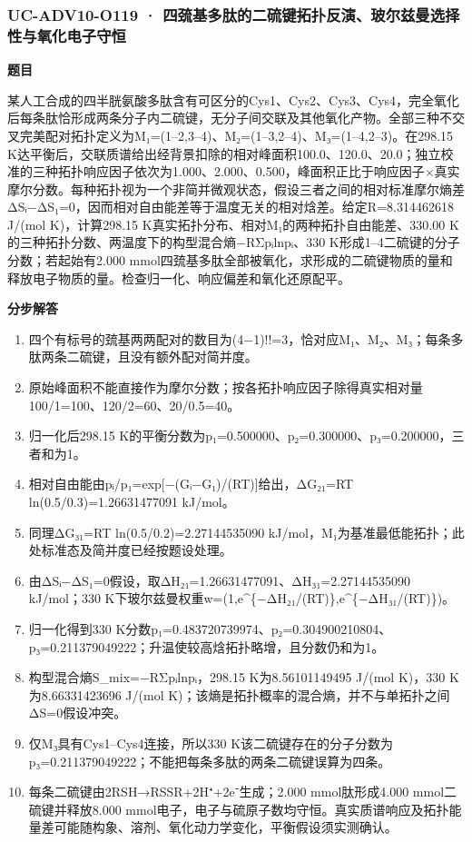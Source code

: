 \documentclass[UTF8,11pt,a4paper]{ctexart}
\begin{document}
\subsubsection*{UC-ADV10-O119 · 四巯基多肽的二硫键拓扑反演、玻尔兹曼选择性与氧化电子守恒}
\noindent\textbf{题目}\par
某人工合成的四半胱氨酸多肽含有可区分的Cys1、Cys2、Cys3、Cys4，完全氧化后每条肽恰形成两条分子内二硫键，无分子间交联及其他氧化产物。全部三种不交叉完美配对拓扑定义为M₁=(1–2,3–4)、M₂=(1–3,2–4)、M₃=(1–4,2–3)。在298.15 K达平衡后，交联质谱给出经背景扣除的相对峰面积100.0、120.0、20.0；独立校准的三种拓扑响应因子依次为1.000、2.000、0.500，峰面积正比于响应因子×真实摩尔分数。每种拓扑视为一个非简并微观状态，假设三者之间的相对标准摩尔熵差ΔSᵢ−ΔS₁=0，因而相对自由能差等于温度无关的相对焓差。给定R=8.314462618 J/(mol K)，计算298.15 K真实拓扑分布、相对M₁的两种拓扑自由能差、330.00 K的三种拓扑分数、两温度下的构型混合熵−RΣpᵢlnpᵢ、330 K形成1–4二硫键的分子分数；若起始有2.000 mmol四巯基多肽全部被氧化，求形成的二硫键物质的量和释放电子物质的量。检查归一化、响应偏差和氧化还原配平。\par
\medskip\noindent\textbf{分步解答}
\begin{enumerate}
\item 四个有标号的巯基两两配对的数目为(4−1)!!=3，恰对应M₁、M₂、M₃；每条多肽两条二硫键，且没有额外配对简并度。
\item 原始峰面积不能直接作为摩尔分数；按各拓扑响应因子除得真实相对量100/1=100、120/2=60、20/0.5=40。
\item 归一化后298.15 K的平衡分数为p₁=0.500000、p₂=0.300000、p₃=0.200000，三者和为1。
\item 相对自由能由pᵢ/p₁=exp[−(Gᵢ−G₁)/(RT)]给出，ΔG₂₁=RT ln(0.5/0.3)=1.26631477091 kJ/mol。
\item 同理ΔG₃₁=RT ln(0.5/0.2)=2.27144535090 kJ/mol，M₁为基准最低能拓扑；此处标准态及简并度已经按题设处理。
\item 由ΔSᵢ−ΔS₁=0假设，取ΔH₂₁=1.26631477091、ΔH₃₁=2.27144535090 kJ/mol；330 K下玻尔兹曼权重w=(1,e\textasciicircum{}\{−ΔH₂₁/(RT)\},e\textasciicircum{}\{−ΔH₃₁/(RT)\})。
\item 归一化得到330 K分数p₁=0.483720739974、p₂=0.304900210804、p₃=0.211379049222；升温使较高焓拓扑略增，且分数仍和为1。
\item 构型混合熵S\_mix=−RΣpᵢlnpᵢ，298.15 K为8.56101149495 J/(mol K)，330 K为8.66331423696 J/(mol K)；该熵是拓扑概率的混合熵，并不与单拓扑之间ΔS=0假设冲突。
\item 仅M₃具有Cys1–Cys4连接，所以330 K该二硫键存在的分子分数为p₃=0.211379049222；不能把每条多肽的两条二硫键误算为四条。
\item 每条二硫键由2RSH→RSSR+2H⁺+2e⁻生成；2.000 mmol肽形成4.000 mmol二硫键并释放8.000 mmol电子，电子与硫原子数均守恒。真实质谱响应及拓扑能量差可能随构象、溶剂、氧化动力学变化，平衡假设须实测确认。
\end{enumerate}
\end{document}
